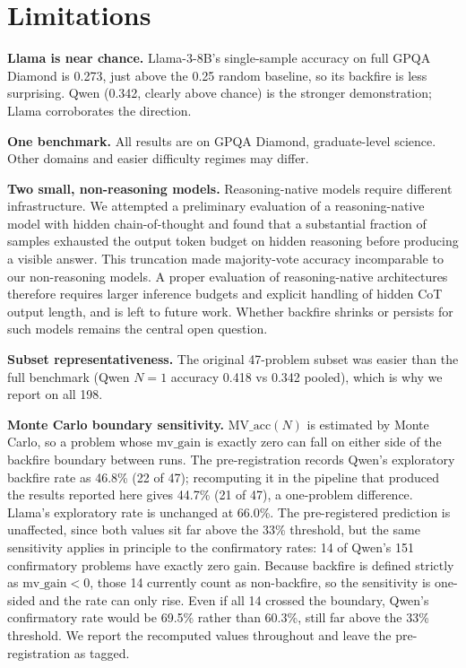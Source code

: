 \documentclass{article}
\begin{document}
\section{Limitations}

\textbf{Llama is near chance.} Llama-3-8B's single-sample accuracy on full
GPQA Diamond is 0.273, just above the 0.25 random baseline, so its backfire
is less surprising. Qwen (0.342, clearly above chance) is the stronger
demonstration; Llama corroborates the direction.

\textbf{One benchmark.} All results are on GPQA Diamond, graduate-level
science. Other domains and easier difficulty regimes may differ.

\textbf{Two small, non-reasoning models.} Reasoning-native models require
different infrastructure. We attempted a preliminary evaluation of a
reasoning-native model with hidden chain-of-thought and found that a
substantial fraction of samples exhausted the output token budget on hidden
reasoning before producing a visible answer. This truncation made
majority-vote accuracy incomparable to our non-reasoning models. A proper
evaluation of reasoning-native architectures therefore requires larger
inference budgets and explicit handling of hidden CoT output length, and is
left to future work. Whether backfire shrinks or persists for such models
remains the central open question.

\textbf{Subset representativeness.} The original 47-problem subset was easier
than the full benchmark (Qwen $N=1$ accuracy 0.418 vs 0.342 pooled), which is
why we report on all 198.

\textbf{Monte Carlo boundary sensitivity.} $\text{MV\_acc}(N)$ is estimated by
Monte Carlo, so a problem whose $\text{mv\_gain}$ is exactly zero can fall on
either side of the backfire boundary between runs. The pre-registration records
Qwen's exploratory backfire rate as 46.8\% (22 of 47); recomputing it in the
pipeline that produced the results reported here gives 44.7\% (21 of 47), a
one-problem difference. Llama's exploratory rate is unchanged at 66.0\%. The
pre-registered prediction is unaffected, since both values sit far above the
33\% threshold, but the same sensitivity applies in principle to the
confirmatory rates: 14 of Qwen's 151 confirmatory problems have exactly zero
gain. Because backfire is defined strictly as $\text{mv\_gain} < 0$, those 14
currently count as non-backfire, so the sensitivity is one-sided and the rate
can only rise. Even if all 14 crossed the boundary, Qwen's confirmatory rate
would be 69.5\% rather than 60.3\%, still far above the 33\% threshold. We
report the recomputed values throughout and leave the pre-registration as
tagged.
\end{document}
